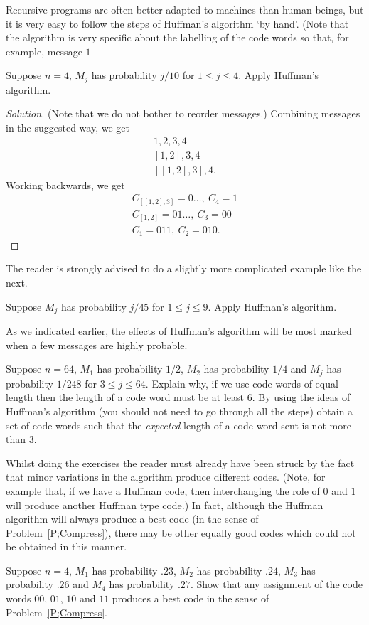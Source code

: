 Recursive programs are often 
better adapted to machines 
than human beings, but it is very easy
to follow the steps of Huffman's algorithm `by hand'.
(Note that the algorithm is very specific about
the labelling of the code words so that, for example,
message $1$ 

\begin{example}\label{E;Huffman do} 
Suppose $n=4$, $M_{j}$ has probability $j/10$ 
for $1\leq j\leq 4$. Apply Huffman's algorithm.
\end{example}
\begin{proof}[Solution]
(Note that we do not bother to reorder messages.)
Combining messages in the suggested way, we get
\begin{gather*}
1,2,3,4\\
[1,2],3,4\\
[[1,2],3],4.
\end{gather*}
Working backwards, we get
\begin{gather*}
C_{[[1,2],3]}=0\ldots,\ C_{4}=1\\
C_{[1,2]}=01\dots,\ C_{3}=00\\
C_{1}=011,\ C_{2}=010.
\end{gather*}
\end{proof}
The reader is strongly advised to do a slightly more
complicated example like the next.
\begin{exercise}\label{E;Huffman 1} 
Suppose $M_{j}$ has probability $j/45$ 
for $1\leq j\leq 9$. Apply Huffman's algorithm.
\end{exercise}

As we indicated earlier, the effects of Huffman's algorithm 
will be most marked when a few messages are highly
probable.
\begin{exercise}\label{E;Huffman 2} Suppose $n=64$,
$M_{1}$ has probability $1/2$,
$M_{2}$ has probability $1/4$ and $M_{j}$ has probability
$1/248$ for $3\leq j\leq 64$.
Explain why, if we use code words of equal length
then the length of a code word must be at least $6$.
By using the ideas of Huffman's algorithm (you should not
need to go through all the steps) obtain a set of
code words such that the \emph{expected} length of a code word
sent is not more than $3$.
\end{exercise}

Whilst doing the exercises the reader must already
have been struck by the fact that minor variations
in the algorithm produce different codes. (Note, for example
that, if we have a Huffman code, then interchanging the role of
$0$ and $1$ will produce another Huffman type code.)
In fact, although the Huffman algorithm will always
produce a best code (in the sense of Problem~\ref{P;Compress}),
there may be other equally good codes which could not
be obtained in this manner.
\begin{exercise}\label{E;Huffman 3} Suppose $n=4$,
$M_{1}$ has probability $.23$,
$M_{2}$ has probability $.24$, 
$M_{3}$ has probability $.26$
and $M_{4}$ has probability $.27$. Show that any 
assignment of the code words $00$, $01$, $10$
and $11$ produces a best code in the sense of Problem~\ref{P;Compress}.
\end{exercise}

